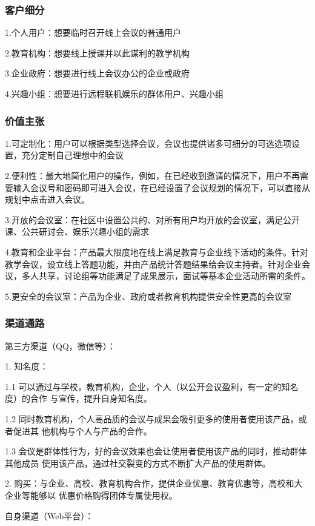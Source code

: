 \documentclass[a4paper,12pt]{article}
\begin{document}
    \subsubsection{客户细分}
    1.个人用户：想要临时召开线上会议的普通用户

    2.教育机构：想要线上授课并以此谋利的教学机构

    3.企业政府：想要进行线上会议办公的企业或政府

    4.兴趣小组：想要进行远程联机娱乐的群体用户、兴趣小组
    \subsubsection{价值主张}
    1.可定制化：用户可以根据类型选择会议，会议也提供诸多可细分的可选选项设置，充分定制自己理想中的会议

    2.便利性：最大地简化用户的操作，例如，在已经收到邀请的情况下，用户不再需要输入会议号和密码即可进入会议，在已经设置了会议规划的情况下，可以直接从规划中点击进入会议。

    3.开放的会议室：在社区中设置公共的、对所有用户均开放的会议室，满足公开课、公共研讨会、娱乐兴趣小组的需求

    4.教育和企业平台：产品最大限度地在线上满足教育与企业线下活动的条件。针对教学会议，设立线上答题功能，并由产品统计答题结果给会议主持者。针对企业会议，多人共享，讨论组等功能满足了成果展示，面试等基本企业活动所需的条件。

    5.更安全的会议室：产品为企业、政府或者教育机构提供安全性更高的会议室
    \subsubsection{渠道通路}
    \noindent 第三方渠道（QQ，微信等）：

    1. 知名度：

    1.1 可以通过与学校，教育机构，企业，个人（以公开会议盈利，有一定的知名度）的合作
    与宣传，提升自身知名度。

    1.2 同时教育机构，个人高品质的会议与成果会吸引更多的使用者使用该产品，或者促进其
    他机构与个人与产品的合作。

    1.3 会议是群体性行为，好的会议效果也会让使用者使用该产品的同时，推动群体其他成员
    使用该产品，通过社交裂变的方式不断扩大产品的使用群体。


    2. 购买：与企业、高校、教育机构合作，提供企业优惠、教育优惠等，高校和大企业等能够以
    优惠价格购得团体专属使用权。

    \vspace{2em}
    \noindent 自身渠道（Web平台）：
\end{document}
